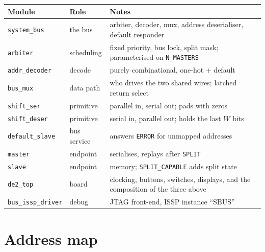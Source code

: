 \documentclass[11pt,a4paper]{article}
\newcommand{\sig}[1]{\texttt{#1}}
\begin{document}
\begin{table}[htb]
\centering\small
\begin{tabularx}{\textwidth}{@{}llX@{}}
\toprule
\textbf{Module} & \textbf{Role} & \textbf{Notes}\\
\midrule
\sig{system\_bus}    & the bus     & arbiter, decoder, mux, address
                                     deserialiser, default responder\\
\sig{arbiter}        & scheduling  & fixed priority, bus lock, split mask;
                                     parameterised on \sig{N\_MASTERS}\\
\sig{addr\_decoder}  & decode      & purely combinational, one-hot + default\\
\sig{bus\_mux}       & data path   & who drives the two shared wires;
                                     latched return select\\
\sig{shift\_ser}     & primitive   & parallel in, serial out; pads with zeros\\
\sig{shift\_deser}   & primitive   & serial in, parallel out; holds the last
                                     $W$ bits\\
\sig{default\_slave} & bus service & answers \sig{ERROR} for unmapped
                                     addresses\\
\sig{master}         & endpoint    & serialises, replays after \sig{SPLIT}\\
\sig{slave}          & endpoint    & memory; \sig{SPLIT\_CAPABLE} adds split
                                     state\\
\sig{de2\_top}       & board       & clocking, buttons, switches, displays,
                                     and the composition of the three above\\
\sig{bus\_issp\_driver} & debug    & JTAG front-end, ISSP instance ``SBUS''\\
\bottomrule
\end{tabularx}
\end{table}

\section{Address map}
\end{document}
